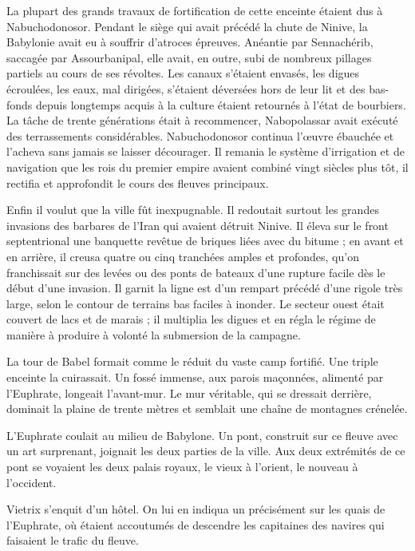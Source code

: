 \documentclass[a4paper, 11pt, oneside, polutonikogreek, french]{article}
\begin{document}
La plupart des grands travaux de fortification de cette enceinte étaient dus à Nabuchodonosor. Pendant le siège qui avait précédé la chute de Ninive, la Babylonie avait eu à souffrir d'atroces épreuves. Anéantie par Sennachérib, saccagée par Assourbanipal, elle avait, en outre, subi de nombreux pillages partiels au cours de ses révoltes. Les canaux s'étaient envasés, les digues écroulées, les eaux, mal dirigées, s'étaient déversées hors de leur lit et des bas-fonds depuis longtemps acquis à la culture étaient retournés à l'état de bourbiers. La tâche de trente générations était à recommencer, Nabopolassar avait exécuté des terrassements considérables. Nabuchodonosor continua l'œuvre ébauchée et l'acheva sans jamais se laisser décourager. Il remania le système d'irrigation et de navigation que les rois du premier empire avaient combiné vingt siècles plus tôt, il rectifia et approfondit le cours des fleuves principaux.

Enfin il voulut que la ville fût inexpugnable. Il redoutait surtout les grandes invasions des barbares de l'Iran qui avaient détruit Ninive. Il éleva sur le front septentrional une banquette revêtue de briques liées avec du bitume ; en avant et en arrière, il creusa quatre ou cinq tranchées amples et profondes, qu'on franchissait sur des levées ou des ponts de bateaux d'une rupture facile dès le début d'une invasion. Il garnit la ligne est d'un rempart précédé d'une rigole très large, selon le contour de terrains bas faciles à inonder. Le secteur ouest était couvert de lacs et de marais ; il multiplia les digues et en régla le régime de manière à produire à volonté la submersion de la campagne.

La tour de Babel formait comme le réduit du vaste camp fortifié. Une triple enceinte la cuirassait. Un fossé immense, aux parois maçonnées, alimenté par l'Euphrate, longeait l'avant-mur. Le mur véritable, qui se dressait derrière, dominait la plaine de trente mètres et semblait une chaîne de montagnes crénelée.

L'Euphrate coulait au milieu de Babylone. Un pont, construit sur ce fleuve avec un art surprenant, joignait les deux parties de la ville. Aux deux extrémités de ce pont se voyaient les deux palais royaux, le vieux à l'orient, le nouveau à l'occident.

\bigskip
\centerline{\EightStarTaper}
\centerline{\EightStarTaper\EightStarTaper}
\bigskip

Vietrix s'enquit d'un hôtel. On lui en indiqua un précisément sur les quais de l'Euphrate, où étaient accoutumés de descendre les capitaines des navires qui faisaient le trafic du fleuve.
\end{document}
